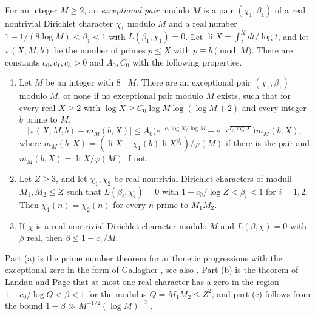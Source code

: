 \begin{theorem}\label{hf-primes-progressions}
For an integer $M\geq2$, an \emph{exceptional pair} modulo $M$ is a pair $(\chi_1,\beta_1)$ of a
real nontrivial Dirichlet character $\chi_1$ modulo $M$ and a real number
$1-1/(8\log M)<\beta_1<1$ with $L(\beta_1,\chi_1)=0$. Let
$\operatorname{li}X=\int_2^X dt/\log t$, and let $\pi(X;M,b)$ be the number of primes $p\leq X$
with $p\equiv b\pmod M$. There are constants $c_0,c_1,c_3>0$ and $A_0,C_0$ with the following
properties.
\begin{enumerate}
\item Let $M$ be an integer with $8\mid M$. There are an exceptional pair $(\chi_1,\beta_1)$ modulo
  $M$, or none if no exceptional pair modulo $M$ exists, such that for every real $X\geq2$ with
  $\log X\geq C_0\log M\log(\log M+2)$ and every integer $b$ prime to $M$,
  \[
   |\pi(X;M,b)-m_M(b,X)|\leq A_0\bigl(e^{-c_3\log X/\log M}+e^{-\sqrt{c_3\log X}}\bigr)m_M(b,X),
  \]
  where $m_M(b,X)=(\operatorname{li}X-\chi_1(b)\operatorname{li}X^{\beta_1})/\varphi(M)$ if there is
  the pair and $m_M(b,X)=\operatorname{li}X/\varphi(M)$ if not.
\item Let $Z\geq3$, and let $\chi_1,\chi_2$ be real nontrivial Dirichlet characters of moduli
  $M_1,M_2\leq Z$ such that $L(\beta_i,\chi_i)=0$ with $1-c_0/\log Z<\beta_i<1$ for $i=1,2$. Then
  $\chi_1(n)=\chi_2(n)$ for every $n$ prime to $M_1M_2$.
\item If $\chi$ is a real nontrivial Dirichlet character modulo $M$ and $L(\beta,\chi)=0$ with
  $\beta$ real, then $\beta\leq1-c_1/M$.
\end{enumerate}
\end{theorem}

Part (a) is the prime number theorem for arithmetic progressions with the exceptional zero in the
form of Gallagher \cite{Gal70}, see also \cite[Chapter 20]{Dav00}. Part (b) is the theorem of
Landau and Page that at most one real character has a zero in the region $1-c_0/\log Q<\beta<1$ for
the modulus $Q=M_1M_2\leq Z^2$, and part (c) follows from the bound
$1-\beta\gg M^{-1/2}(\log M)^{-2}$ \cite[Chapter 14]{Dav00}.


